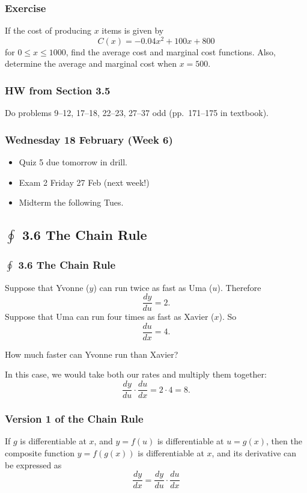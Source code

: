 \documentclass[14pt]{beamer}
\begin{document}
\begin{frame}%
\frametitle{Exercise}
If the cost of producing $x$ items is given by 
$$C(x)=-0.04x^2+100x+800$$
for $0 \le x \le 1000$, find the average cost and marginal cost functions.  Also, determine the average and marginal cost when $x=500.$
\end{frame}

\begin{frame}
\frametitle{HW from Section 3.5}
Do problems 9--12, 17--18, 22--23, 27--37 odd (pp.\ 171--175 in textbook).
\end{frame}


\begin{frame}
\frametitle{Wednesday 18 February (Week 6)}
\begin{itemize}
\item Quiz 5 due tomorrow in drill.
\item Exam 2 Friday 27 Feb (next week!)
\item Midterm the following Tues.
\end{itemize}
\end{frame}

\begin{frame}
\subsection[3.6 The Chain Rule]{$\oint$ 3.6 The Chain Rule}
\frametitle{$\oint$ 3.6 The Chain Rule}
\small
Suppose that Yvonne ($y$) can run twice as fast as Uma ($u$). Therefore $$\dfrac{dy}{du}=2.$$  Suppose that Uma can run four times as fast as Xavier ($x$).  So 
$$\dfrac{du}{dx}=4.$$

\bigskip

How much faster can Yvonne run than Xavier?

\bigskip

In this case, we would take both our rates and multiply them together:
$$\frac{dy}{du} \cdot \frac{du}{dx}=2 \cdot 4 = 8.$$
\end{frame}

\begin{frame}
\frametitle{Version 1 of the Chain Rule}
If $g$ is differentiable at $x$, and $y=f(u)$ is differentiable at $u=g(x)$, then the composite function $y=f(g(x))$ is differentiable at $x$, and its derivative can be expressed as 
$$\frac{dy}{dx}=\frac{dy}{du} \cdot \frac{du}{dx}$$
\end{frame}
\end{document}

